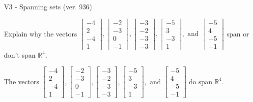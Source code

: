 \begin{exercise}
  \begin{exerciseTitle}V3 - Spanning sets (ver. 936)\end{exerciseTitle}
  \begin{exerciseStatement}
    Explain why the vectors \(\left[\begin{array}{r}
-4 \\
2 \\
-4 \\
1
\end{array}\right] , \left[\begin{array}{r}
-2 \\
-3 \\
0 \\
-1
\end{array}\right] , \left[\begin{array}{r}
-3 \\
-2 \\
-3 \\
-3
\end{array}\right] , \left[\begin{array}{r}
-5 \\
3 \\
-3 \\
1
\end{array}\right] , \text{ and } \left[\begin{array}{r}
-5 \\
4 \\
-5 \\
-1
\end{array}\right]\) span or don't span \(\mathbb{R}^4\). 
	


  \end{exerciseStatement}
  \begin{exerciseAnswer}
   The vectors \(\left[\begin{array}{r}
-4 \\
2 \\
-4 \\
1
\end{array}\right] , \left[\begin{array}{r}
-2 \\
-3 \\
0 \\
-1
\end{array}\right] , \left[\begin{array}{r}
-3 \\
-2 \\
-3 \\
-3
\end{array}\right] , \left[\begin{array}{r}
-5 \\
3 \\
-3 \\
1
\end{array}\right] , \text{ and } \left[\begin{array}{r}
-5 \\
4 \\
-5 \\
-1
\end{array}\right]\) 
  	 do  
	span \(\mathbb{R}^4\).
  



\end{exerciseAnswer}
\end{exercise}
